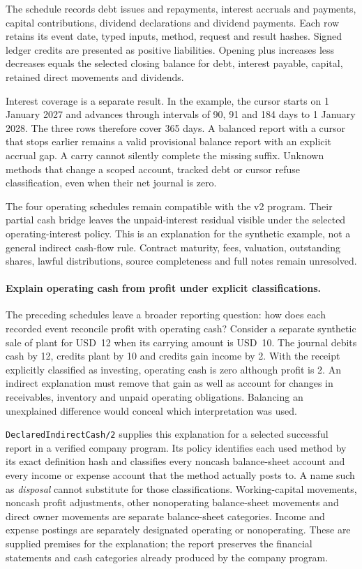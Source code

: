 The schedule records debt issues and repayments, interest accruals and payments, capital contributions, dividend declarations and dividend payments. Each row retains its event date, typed inputs, method, request and result hashes. Signed ledger credits are presented as positive liabilities. Opening plus increases less decreases equals the selected closing balance for debt, interest payable, capital, retained direct movements and dividends.

Interest coverage is a separate result. In the example, the cursor starts on 1 January 2027 and advances through intervals of 90, 91 and 184 days to 1 January 2028. The three rows therefore cover 365 days. A balanced report with a cursor that stops earlier remains a valid provisional balance report with an explicit accrual gap. A carry cannot silently complete the missing suffix. Unknown methods that change a scoped account, tracked debt or cursor refuse classification, even when their net journal is zero.

The four operating schedules remain compatible with the v2 program. Their partial cash bridge leaves the unpaid-interest residual visible under the selected operating-interest policy. This is an explanation for the synthetic example, not a general indirect cash-flow rule. Contract maturity, fees, valuation, outstanding shares, lawful distributions, source completeness and full notes remain unresolved.

\paragraph{Explain operating cash from profit under explicit classifications.}
The preceding schedules leave a broader reporting question: how does each
recorded event reconcile profit with operating cash? Consider a separate
synthetic sale of plant for USD~12 when its carrying amount is USD~10. The
journal debits cash by 12, credits plant by 10 and credits gain income by 2.
With the receipt explicitly classified as investing, operating cash is zero
although profit is 2. An indirect explanation must remove that gain as well as
account for changes in receivables, inventory and unpaid operating obligations.
Balancing an unexplained difference would conceal which interpretation was used.

\texttt{DeclaredIndirectCash/2} supplies this explanation for a selected successful
report in a verified company program. Its policy identifies each used method
by its exact definition hash and classifies every noncash balance-sheet account
and every income or expense account that the method actually posts to. A name
such as \emph{disposal} cannot substitute for those classifications. Working-capital
movements, noncash profit adjustments, other nonoperating balance-sheet movements
and direct owner movements are separate balance-sheet categories. Income and
expense postings are separately designated operating or nonoperating. These are
supplied premises for the explanation; the report preserves the financial
statements and cash categories already produced by the company program.

